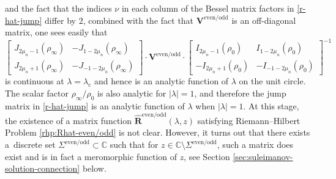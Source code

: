 \documentclass[pdftex]{sigma}
\numberwithin{equation}{section}
\newcommand{\C}{{\mathbb{C}}}
\begin{document}
and the fact that the indices $\nu$ in each column of the Bessel matrix factors in \eqref{r-hat-jump} differ by $2$, combined with the fact that $\mathbf{V}^\mathrm{even/odd}$ is an off-diagonal matrix, one sees easily that
\[
\begin{bmatrix}J_{2\mu_n - 1}(\rho_\infty) & -J_{1- 2\mu_n}(\rho_\infty)\\
 J_{2\mu_n +1}(\rho_\infty) & -J_{-1-2\mu_n}(\rho_\infty)\end{bmatrix}\cdot\mathbf{V}^\mathrm{even/odd}
 \cdot \begin{bmatrix}I_{2\mu_n - 1}(\rho_0) & I_{1- 2\mu_n}(\rho_0)\\
 -I_{2\mu_n +1}(\rho_0) & -I_{-1-2\mu_n}(\rho_0)\end{bmatrix}^{-1}
\]
is continuous at $\lambda=\lambda_\mathrm{c}$ and hence is an analytic function of $\lambda$ on the unit circle. The scalar factor $\rho_\infty/\rho_0$ is also analytic for $|\lambda|=1$, and therefore the jump matrix in \eqref{r-hat-jump} is an analytic function of $\lambda$ when $|\lambda|=1$. At this stage, the existence of a matrix function $\hat{\mathbf{R}}^\mathrm{even/odd}(\lambda, z)$ satisfying Riemann--Hilbert Problem \ref{rhp:Rhat-even/odd} is not clear. However, it turns out that there exists a~discrete set $\Sigma^{\mathrm{even/odd}} \subset \C$ such that for $z \in \C \setminus \Sigma^{\mathrm{even/odd}}$, such a matrix does exist and is in fact a meromorphic function of $z$, see Section \ref{sec:suleimanov-solution-connection} below.
\end{document}
